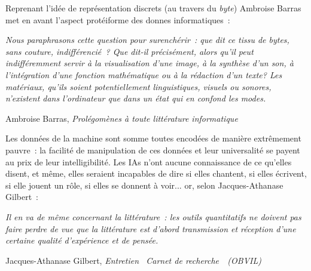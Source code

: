 \documentclass{article}
\newenvironment{citationbox}
{\begin{center}
		\begin{minipage}{.8\textwidth}
		}
		{
		\end{minipage}	
\end{center}
}
\begin{document}
				Reprenant l'idée de représentation discrets (au travers du \textit{byte}) Ambroise Barras met en avant l'aspect protéiforme des donnes informatiques~:
				\begin{citationbox}
					\textit{Nous paraphrasons cette question pour surenchérir~: que dit ce
						tissu de bytes, sans couture, indifférencié~? Que dit-il précisément, alors
						qu'il peut indifféremment servir à la visualisation d'une image, à la
						synthèse d'un son, à l'intégration d'une fonction mathématique ou à la
						rédaction d'un texte? Les matériaux, qu'ils soient potentiellement
						linguistiques, visuels ou sonores, n'existent dans l'ordinateur que dans
						un état qui en confond les modes.}
					\begin{flushright}
						Ambroise Barras, \textit{Prolégomènes à toute littérature informatique} \autocite{barras1995}
					\end{flushright}
				\end{citationbox}
				Les données de la machine sont somme toutes encodées de manière extrêmement pauvre~: la facilité de manipulation de ces données et leur universalité se payent au prix de leur intelligibilité. Les IAs n'ont aucune connaissance de ce qu'elles disent, et même, elles seraient incapables de dire si elles chantent, si elles écrivent, si elle jouent un rôle, si elles se donnent à voir... or, selon Jacques-Athanase Gilbert~:
				\begin{citationbox}
					\textit{Il en va de même concernant la littérature~: les outils quantitatifs ne doivent pas faire perdre de vue que la littérature est d’abord transmission et réception d’une certaine qualité d’expérience et de pensée.}
					\begin{flushright}
						Jacques-Athanase Gilbert, \textit{Entretien \guillemotleft~Carnet de recherche~\guillemotright~(OBVIL)} \autocite{gilbert2018}
					\end{flushright}
				\end{citationbox}
				
\end{document}
